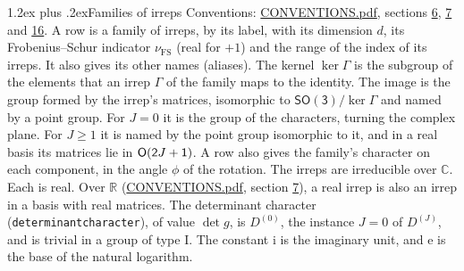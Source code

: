 \documentclass[10pt,a4paper]{article}
\makeatletter
\renewcommand\section{\@startsection{section}{1}{\z@}{-3ex plus -1ex minus -.2ex}%
  {1.2ex plus .2ex}{\normalfont\large\sffamily\bfseries\color{parttitle}}}
\numberwithin{equation}{section}
\newcommand{\grp}[1]{\mathsf{#1}}
\newcommand{\iunit}{\mathrm{i}}
\newcommand{\expe}{\mathrm{e}}
\newcommand{\irrJ}[1]{D^{(#1)}}
\newcommand{\fsind}{\nu_{\mathrm{FS}}}
\makeatother
\begin{document}
\section{Families of irreps}\label{s:families}
Conventions: \href{../../CONVENTIONS.pdf}{CONVENTIONS.pdf}, sections \href{../../CONVENTIONS.pdf\#conv.6}{6}, \href{../../CONVENTIONS.pdf\#conv.7}{7} and \href{../../CONVENTIONS.pdf\#conv.16}{16}.
\leavevmode\label{n:index.dimension}\label{n:index.frobenius}\label{n:head.family.irreps}\label{n:head.index.family}A row is a family of irreps, by its label, with its dimension $d$, its Frobenius--Schur indicator $\fsind$ (real for $+1$) and the range of the index of its irreps. \label{n:head.aliases}It also gives its other names (aliases). \label{n:irrep.Gamma}\label{n:head.kernel}The kernel $\ker\Gamma$ is the subgroup of the elements that an irrep $\Gamma$ of the family maps to the identity. \label{n:head.image}The image is the group formed by the irrep's matrices, isomorphic to $\grp{SO(3)}/\ker\Gamma$ and named by a point group. For $J = 0$ it is the group of the characters, turning the complex plane. For $J \ge 1$ it is named by the point group isomorphic to it, and in a real basis its matrices lie in $\grp{O(2\mathnormal{J} + 1)}$. A row also gives the family's character on each component, in the angle $\phi$ of the rotation. The irreps are irreducible over $\mathbb{C}$. Each is real. Over $\mathbb{R}$ (\href{../../CONVENTIONS.pdf}{CONVENTIONS.pdf}, section \href{../../CONVENTIONS.pdf\#conv.7}{7}), a real irrep is also an irrep in a basis with real matrices. The determinant character (\texttt{determinantcharacter}), of value $\det g$, is $\irrJ{0}$, the instance $J = 0$ of $\irrJ{J}$, and is trivial in a group of type I.
The constant $\iunit$ is the imaginary unit, and $\expe$ is the base of the natural logarithm.
\end{document}
